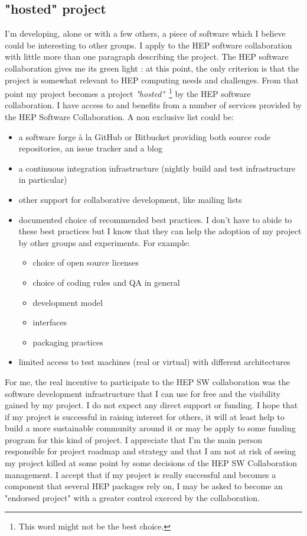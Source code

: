 \documentclass[11pt]{article} %
\begin{document}
\subsection{"hosted" project }
I'm developing, alone or with a few others, a piece of software which I believe could be interesting to other groups. I apply to the HEP software collaboration 
with little more than one paragraph describing the project. The HEP software collaboration gives me its green light : at this point, the only criterion is that 
the project is somewhat relevant to HEP computing needs and challenges. From that point my project becomes a project {\em "hosted"}~\footnote{This word might not be the best choice.} 
by the HEP software collaboration. I have access to and benefits from a number of services provided by the HEP Software Collaboration. A non exclusive list could be:
\begin{itemize}
\item a software forge à la GitHub or Bitbucket providing both source code repositories, an issue tracker and a blog
\item a continuous integration infrastructure (nightly build and test infrastructure in particular)
\item other support for collaborative development, like mailing lists
\item documented choice of recommended best practices. I don't have to abide to these best practices but I know that they can help the adoption of my project by other groups and experiments. For example:
\begin{itemize}
\item choice of open source licenses
\item choice of coding rules and QA in general
\item development model
\item interfaces
\item packaging practices
\end{itemize}

\item limited access to test machines (real or virtual) with different architectures
\end{itemize}

For me, the real incentive to participate to the HEP SW collaboration was the software development infrastructure
that I can use for free and the visibility gained by my project. I do not expect any direct support or funding. I hope that
if my project is successful in raising interest for others, it will at least help to build a more sustainable community around
it or may be apply to some funding program for this kind of project. I appreciate that I'm the main person responsible for project
roadmap and strategy and that I am not at risk of seeing my project killed at some point by some decisions of the HEP SW Collaboration
management. I accept that if my project is really successful and becomes a component that several HEP packages rely on, I may be
asked to become an "endorsed project" with a greater control exerced by the collaboration.
\end{document}

